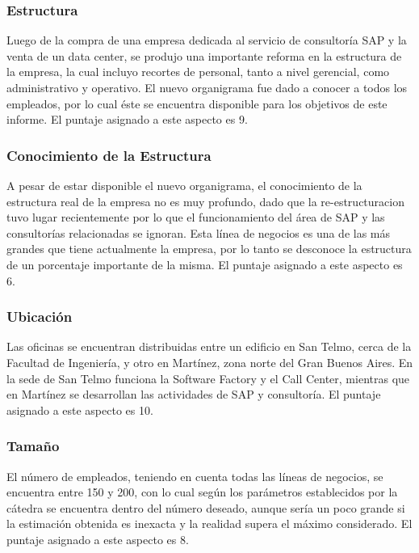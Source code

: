 \documentclass[12pt,a4paper,spanish]{article}
\begin{document}
\subsubsection{Estructura}

Luego de la compra de una empresa dedicada al servicio de consultor\'{i}a SAP y la venta de un data center, se produjo una importante reforma en la estructura de la empresa, la cual incluyo recortes de personal, tanto a nivel gerencial, como administrativo y operativo. El nuevo organigrama fue dado a conocer a todos los empleados, por lo cual \'{e}ste se encuentra disponible para los objetivos de este informe. El puntaje asignado a este aspecto es 9.

\subsubsection{Conocimiento de la Estructura}

A pesar de estar disponible el nuevo organigrama, el conocimiento de la estructura real de la empresa no es muy profundo, dado que la re-estructuracion tuvo lugar recientemente por lo que el funcionamiento del \'{a}rea de SAP y las consultor\'{i}as relacionadas se ignoran. Esta l\'{i}nea de negocios es una de las m\'{a}s grandes que tiene actualmente la empresa, por lo tanto se desconoce la estructura de un porcentaje importante de la misma. El puntaje asignado a este aspecto es 6.

\subsubsection{Ubicaci\'{o}n}

Las oficinas se encuentran distribuidas entre un edificio en San Telmo, cerca de la Facultad de Ingenier\'{i}a, y otro en Mart\'{i}nez, zona norte del Gran Buenos Aires. En la sede de San Telmo funciona la Software Factory y el Call Center, mientras que en Mart\'{i}nez se desarrollan las actividades de SAP y consultor\'{i}a. El puntaje asignado a este aspecto es 10.

\subsubsection{Tama\~{n}o}

El número de empleados, teniendo en cuenta todas las l\'{i}neas de negocios, se encuentra entre 150 y 200, con lo cual seg\'{u}n los par\'{a}metros establecidos por la c\'{a}tedra se encuentra dentro del n\'{u}mero deseado, aunque ser\'{i}a un poco grande si la estimaci\'{o}n obtenida es inexacta y la realidad supera el m\'{a}ximo considerado. El puntaje asignado a este aspecto es 8. 
\end{document}
